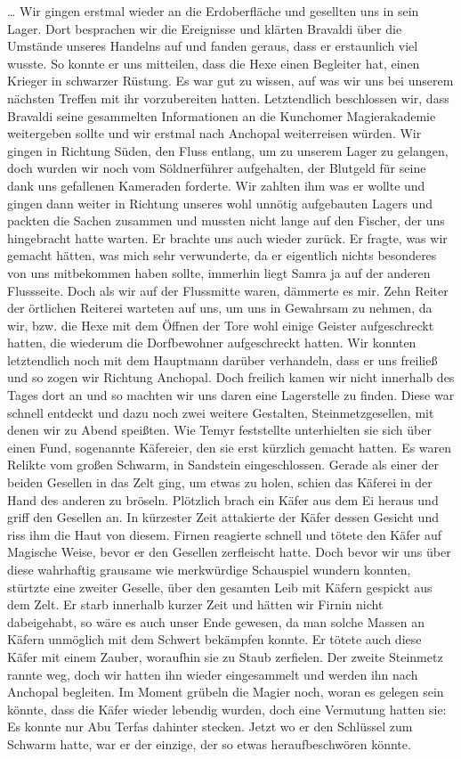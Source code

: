 … Wir gingen erstmal wieder an die Erdoberfläche und gesellten uns in sein Lager. Dort besprachen wir die Ereignisse und klärten Bravaldi über die Umstände unseres Handelns auf und fanden geraus, dass er erstaunlich viel wusste. So konnte er uns mitteilen, dass die Hexe einen Begleiter hat, einen Krieger in schwarzer Rüstung. Es war gut zu wissen, auf was wir uns bei unserem nächsten Treffen mit ihr vorzubereiten hatten. Letztendlich beschlossen wir, dass Bravaldi seine gesammelten Informationen an die Kunchomer Magierakademie weitergeben sollte und wir erstmal nach Anchopal weiterreisen würden. Wir gingen in Richtung Süden, den Fluss entlang, um zu unserem Lager zu gelangen, doch wurden wir noch vom Söldnerführer aufgehalten, der Blutgeld für seine dank uns gefallenen Kameraden forderte. Wir zahlten ihm was er wollte und gingen dann weiter in Richtung unseres wohl unnötig aufgebauten Lagers und packten die Sachen zusammen und mussten nicht lange auf den Fischer, der uns hingebracht hatte warten. Er brachte uns auch wieder zurück. Er fragte, was wir gemacht hätten, was mich sehr verwunderte, da er eigentlich nichts besonderes von uns mitbekommen haben sollte, immerhin liegt Samra ja auf der anderen Flussseite. Doch als wir auf der Flussmitte waren, dämmerte es mir. Zehn Reiter der örtlichen Reiterei warteten auf uns, um uns in Gewahrsam zu nehmen, da wir, bzw. die Hexe mit dem Öffnen der Tore wohl einige Geister aufgeschreckt hatten, die wiederum die Dorfbewohner aufgeschreckt hatten. Wir konnten letztendlich noch mit dem Hauptmann darüber verhandeln, dass er uns freiließ und so zogen wir Richtung Anchopal. Doch freilich kamen wir nicht innerhalb des Tages dort an und so machten wir uns daren eine Lagerstelle zu finden. Diese war schnell entdeckt und dazu noch zwei weitere Gestalten, Steinmetzgesellen, mit denen wir zu Abend speißten. Wie Temyr feststellte unterhielten sie sich über einen Fund, sogenannte Käfereier, den sie erst kürzlich gemacht hatten. Es waren Relikte vom großen Schwarm, in Sandstein eingeschlossen. Gerade als einer der beiden Gesellen in das Zelt ging, um etwas zu holen, schien das Käferei in der Hand des anderen zu bröseln. Plötzlich brach ein Käfer aus dem Ei heraus und griff den Gesellen an. In kürzester Zeit attakierte der Käfer dessen Gesicht und riss ihm die Haut von diesem. Firnen reagierte schnell und tötete den Käfer auf Magische Weise, bevor er den Gesellen zerfleischt hatte. Doch bevor wir uns über diese wahrhaftig grausame wie merkwürdige Schauspiel wundern konnten, stürtzte eine zweiter Geselle, über den gesamten Leib mit Käfern gespickt aus dem Zelt. Er starb innerhalb kurzer Zeit und hätten wir Firnin nicht dabeigehabt, so wäre es auch unser Ende gewesen, da man solche Massen an Käfern unmöglich mit dem Schwert bekämpfen konnte. Er tötete auch diese Käfer mit einem Zauber, woraufhin sie zu Staub zerfielen. Der zweite Steinmetz rannte weg, doch wir hatten ihn wieder eingesammelt und werden ihn nach Anchopal begleiten. Im Moment grübeln die Magier noch, woran es gelegen sein könnte, dass die Käfer wieder lebendig wurden, doch eine Vermutung hatten sie: Es konnte nur Abu Terfas dahinter stecken. Jetzt wo er den Schlüssel zum Schwarm hatte, war er der einzige, der so etwas heraufbeschwören könnte.

